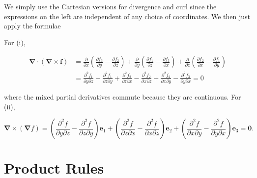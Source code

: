 \begin{proofidea}
  
  We simply use the Cartesian versions for divergence and curl since the expressions on the left are independent of any choice of coordinates. We then just apply the formulae
  
\end{proofidea}
  
\begin{formalproof}

For (i),

\[
\begin{aligned}
\boldsymbol{\nabla} \cdot(\boldsymbol{\nabla} \times \boldsymbol{f}) & =\frac{\partial}{\partial x}\left(\frac{\partial f_3}{\partial y}-\frac{\partial f_2}{\partial z}\right)+\frac{\partial}{\partial y}\left(\frac{\partial f_1}{\partial z}-\frac{\partial f_3}{\partial x}\right)+\frac{\partial}{\partial z}\left(\frac{\partial f_2}{\partial x}-\frac{\partial f_1}{\partial y}\right) \\
& =\frac{\partial^2 f_1}{\partial y \partial z}-\frac{\partial^2 f_1}{\partial z \partial y}+\frac{\partial^2 f_2}{\partial z \partial x}-\frac{\partial^2 f_2}{\partial x \partial z}+\frac{\partial^2 f_2}{\partial x \partial y}-\frac{\partial^2 f_3}{\partial y \partial x}=0
\end{aligned}
\]

where the mixed partial derivatives commute because they are continuous. For (ii),

\[
\boldsymbol{\nabla} \times(\boldsymbol{\nabla} f)=\left(\frac{\partial^2 f}{\partial y \partial z}-\frac{\partial^2 f}{\partial z \partial y}\right) \boldsymbol{e}_1+\left(\frac{\partial^2 f}{\partial z \partial x}-\frac{\partial^2 f}{\partial x \partial z}\right) \boldsymbol{e}_2+\left(\frac{\partial^2 f}{\partial x \partial y}-\frac{\partial^2 f}{\partial y \partial x}\right) \boldsymbol{e}_3=\mathbf{0} .
\]

\end{formalproof}

\section{Product Rules}

